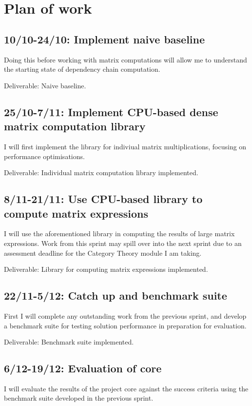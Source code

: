\documentclass[a4paper,12pt]{article}
\begin{document}
\section{Plan of work}

\subsection*{10/10-24/10: Implement naive baseline}
Doing this before working with matrix computations will allow me to understand
the starting state of dependency chain computation.

\medskip\noindent Deliverable: Naive baseline.

\subsection*{25/10-7/11: Implement CPU-based dense matrix computation library}
I will first implement the library for indiviual matrix multiplications,
focusing on performance optimisations.

\medskip\noindent Deliverable: Individual matrix computation library implemented.

\subsection*{8/11-21/11: Use CPU-based library to compute matrix expressions}
I will use the aforementioned library in computing the results of large matrix expressions.
Work from this sprint may spill over into the next sprint due to an assessment deadline for
the Category Theory module I am taking.

\medskip\noindent Deliverable: Library for computing matrix expressions implemented.

\subsection*{22/11-5/12: Catch up and benchmark suite}
First I will complete any outstanding work from the previous sprint, and develop a benchmark suite
for testing solution performance in preparation for evaluation.

\medskip\noindent Deliverable: Benchmark suite implemented.

\subsection*{6/12-19/12: Evaluation of core}
I will evaluate the results of the project core against the success criteria using the benchmark
suite developed in the previous sprint.
\end{document}
